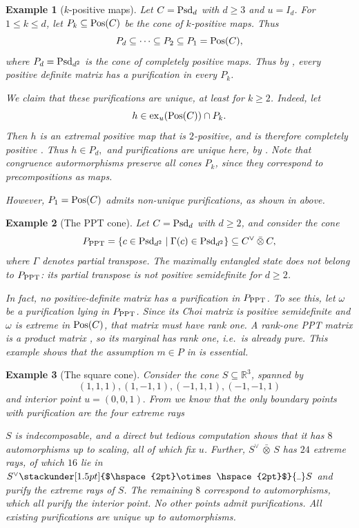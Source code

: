 \documentclass[11pt]{article}
\newcommand\barbelow[1]{\stackunder[1.5pt]{$\hspace{2pt}#1\hspace{2pt}$}{\rule{1ex}{0.075ex}}}
\newcommand{\barabove}[1]{\hspace{2pt}\bar{#1}\hspace{2pt}}
\theoremstyle{result}
\theoremstyle{discussion}
\newtheorem{example}[example]{Example}
\newcommand{\omin}{\barbelow{\otimes}}
\newcommand{\omax}{\barabove{\otimes}}
\begin{document}
\begin{example}[$k$-positive maps]
    Let $C={\rm Psd}_d$ with $d\geqslant3$ and $u=I_d$. For
    $1\leqslant k\leqslant d$, let $P_k\subseteq{\rm Pos}(C)$ be the cone of
    $k$-positive maps. Thus
    \[
        P_d\subseteq\cdots\subseteq P_2\subseteq P_1={\rm Pos}(C),
    \]
    where $P_d={\rm Psd}_{d^2}$ is the cone of completely positive maps. Thus by , every positive definite matrix has a purification in every $P_k$.

    We claim that these purifications are unique, at least for $k\geqslant2$. Indeed,
    let
    \[
        h\in{\rm ex}_u({\rm Pos}(C))\cap P_k.
    \]
    Then $h$ is an extremal positive map that is $2$-positive, and is
    therefore completely positive
    \citep[Theorem~3.4]{Marciniak2010}. Thus $h\in P_d,$ and purifications are unique here, by . Note that congruence autormorphisms preserve all cones $P_k$, since they correspond to precompositions as maps.
    
    However, $P_1={\rm Pos}(C)$ admits
    non-unique purifications, as shown in  above.
\end{example}

\begin{example}[The PPT cone]
    Let $C={\rm Psd}_d$ with $d\geqslant2$, and consider the cone
    \[
        P_{\rm PPT}
        =\{c\in{\rm Psd}_{d^2}\mid \Gamma(c)\in{\rm Psd}_{d^2}\}
        \subseteq C^\vee\omax C,
    \]
    where $\Gamma$ denotes partial transpose. The maximally entangled state
    does not belong to $P_{\rm PPT}$: its partial transpose is not positive semidefinite for $d\geqslant2$.

    In fact, no positive-definite matrix has a purification in
    $P_{\rm PPT}$. To see this, let $\omega$ be a purification lying in
    $P_{\rm PPT}$. Since its Choi matrix is positive semidefinite and
    $\omega$ is extreme in ${\rm Pos}(C)$, that matrix must have rank one.
    A rank-one PPT matrix is a product matrix
    \citep[Lemma~2.14]{AubrunSzarek2017}, so its marginal has rank one,
    i.e.\ is already pure. This example shows that the assumption $m\in P$
    in  is essential.
\end{example}

\begin{example}[The square cone]
    Consider the cone $S\subseteq\mathbb R^3$, spanned by 
    $$
        (1,1,1),(1,-1,1),(-1,1,1),(-1,-1,1)
    $$
    and interior point $u=(0,0,1).$
    From  we know that the only boundary points with purification are the four extreme rays

    $S$  is indecomposable, and a direct but tedious computation shows that it has $8$ automorphisms up to scaling, all of which fix $u$. Further, $S^\vee\omax S$ has $24$ extreme rays, of which $16$ lie in $S^\vee\omin S$ and purify the extreme rays of $S$. The remaining $8$ correspond to automorphisms, which all purify the interior point. No other points admit purifications. All existing purifications are unique up to automorphisms.
\end{example}
\end{document}
